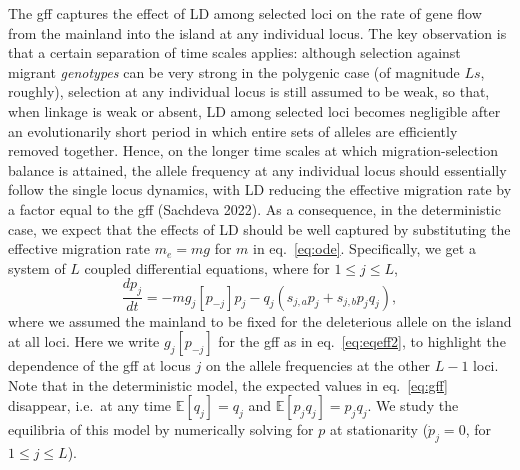 \documentclass[
  11pt,
]{article}
\begin{document}
The gff captures the effect of LD among selected loci on the rate of
gene flow from the mainland into the island at any individual locus. The
key observation is that a certain separation of time scales applies:
although selection against migrant \emph{genotypes} can be very strong
in the polygenic case (of magnitude \(Ls\), roughly), selection at any
individual locus is still assumed to be weak, so that, when linkage is
weak or absent, LD among selected loci becomes negligible after an
evolutionarily short period in which entire sets of alleles are
efficiently removed together. Hence, on the longer time scales at which
migration-selection balance is attained, the allele frequency at any
individual locus should essentially follow the single locus dynamics,
with LD reducing the effective migration rate by a factor equal to the
gff (Sachdeva 2022). As a consequence, in the deterministic case, we
expect that the effects of LD should be well captured by substituting
the effective migration rate \(m_e = mg\) for \(m\) in eq.~\ref{eq:ode}.
Specifically, we get a system of \(L\) coupled differential equations,
where for \(1 \le j \le L\), \begin{equation}
   \frac{dp_j}{dt} = -m g_j[p_{-j}]p_j - q_j(s_{j,a}p_j + s_{j,b}p_jq_j),
   \label{eq:odeme}
\end{equation} where we assumed the mainland to be fixed for the
deleterious allele on the island at all loci. Here we write
\(g_j[p_{-j}]\) for the gff as in eq.~\ref{eq:eqeff2}, to highlight the
dependence of the gff at locus \(j\) on the allele frequencies at the
other \(L-1\) loci. Note that in the deterministic model, the expected
values in eq.~\ref{eq:gff} disappear, i.e.~at any time
\(\mathbb{E}[q_j] = q_j\) and \(\mathbb{E}[p_jq_j] = p_jq_j\). We study
the equilibria of this model by numerically solving for \(p\) at
stationarity (\(\dot{p}_j = 0\), for \(1 \le j \le L\)).
\end{document}
